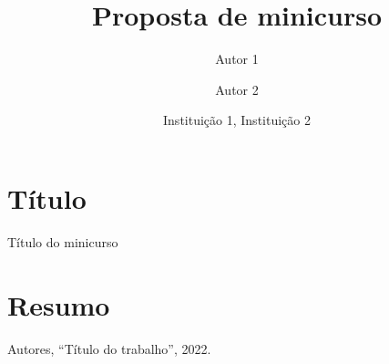 \documentclass[12pt]{article}
\title{Proposta de minicurso}
\author{Autor 1 \and Autor 2}
\date{Instituição 1, Instituição 2}
\begin{document}
\maketitle

\section{Título}

Título do minicurso

\section{Resumo}

\lipsum[1]

\begin{thebibliography}{XXXXXX}

 Autores, ``Título do trabalho'', 2022.

\end{thebibliography}
\end{document}
